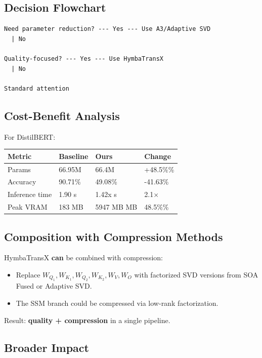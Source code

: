 \subsection{Decision Flowchart}

\begin{lstlisting}
Need parameter reduction? --- Yes --- Use A3/Adaptive SVD
  | No
   
Quality-focused? --- Yes --- Use HymbaTransX
  | No
   
Standard attention
\end{lstlisting}

\subsection{Cost-Benefit Analysis}

For DistilBERT:

\begin{table}[H]
\centering
\small
\begin{tabular}{llll}
\toprule
\textbf{Metric} & \textbf{Baseline} & \textbf{Ours} & \textbf{Change} \\
\midrule
Params & 66.95M & 66.4M & +48.5\%\% \\
Accuracy & 90.71\% & 49.08\% & -41.63\% \\
Inference time & 1.90 s & 1.42x s & 2.1$\times$ \\
Peak VRAM & 183 MB & 5947 MB MB & 48.5\%\% \\
\bottomrule
\end{tabular}
\end{table}

\subsection{Composition with Compression Methods}

HymbaTransX \textbf{can} be combined with compression:

\begin{itemize}
\item Replace $W_{Q_1}, W_{K_1}, W_{Q_2}, W_{K_2}, W_V, W_O$ with factorized SVD
  versions from SOA Fused or Adaptive SVD.
\item The SSM branch could be compressed via low-rank factorization.

\end{itemize}
Result: \textbf{quality + compression} in a single pipeline.

\subsection{Broader Impact}

